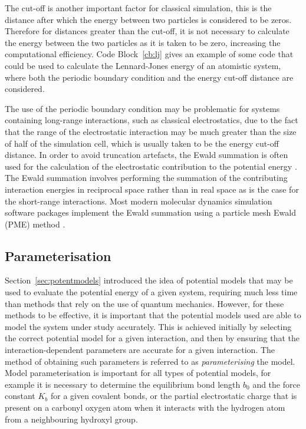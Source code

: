 The cut-off is another important factor for classical simulation, this is the distance after which the energy between two particles is considered to be zeros.
Therefore for distances greater than the cut-off, it is not necessary to calculate the energy between the two particles as it is taken to be zero, increasing the computational efficiency.
Code Block~\ref{cb:lj} gives an example of some code that could be used to calculate the Lennard-Jones energy of an atomistic system, where both the periodic boundary condition and the energy cut-off distance are considered.
%
\begin{figure}
    \centering
        
\end{figure}
%

The use of the periodic boundary condition may be problematic for systems containing long-range interactions, such as classical electrostatics, due to the fact that the range of the electrostatic interaction may be much greater than the size of half of the simulation cell, which is usually taken to be the energy cut-off distance.
In order to avoid truncation artefacts, the Ewald summation is often used for the calculation of the electrostatic contribution to the potential energy \cite{ewald_berechnung_1921}.
The Ewald summation involves performing the summation of the contributing interaction energies in reciprocal space rather than in real space as is the case for the short-range interactions.
Most modern molecular dynamics simulation software packages implement the Ewald summation using a particle mesh Ewald (PME) method \cite{essmann_smooth_1995}.

\subsection{Parameterisation}
\label{sec:parameterisation}
Section~\ref{sec:potentmodels} introduced the idea of potential models that may be used to evaluate the potential energy of a given system, requiring much less time than methods that rely on the use of quantum mechanics.
However, for these methods to be effective, it is important that the potential models used are able to model the system under study accurately.
This is achieved initially by selecting the correct potential model for a given interaction, and then by ensuring that the interaction-dependent parameters are accurate for a given interaction.
The method of obtaining such parameters is referred to as \emph{parameterising} the model.
Model parameterisation is important for all types of potential models, for example it is necessary to determine the equilibrium bond length $b_0$ and the force constant $K_b$ for a given covalent bonds, or the partial electrostatic charge that is present on a carbonyl oxygen atom when it interacts with the hydrogen atom from a neighbouring hydroxyl group.

